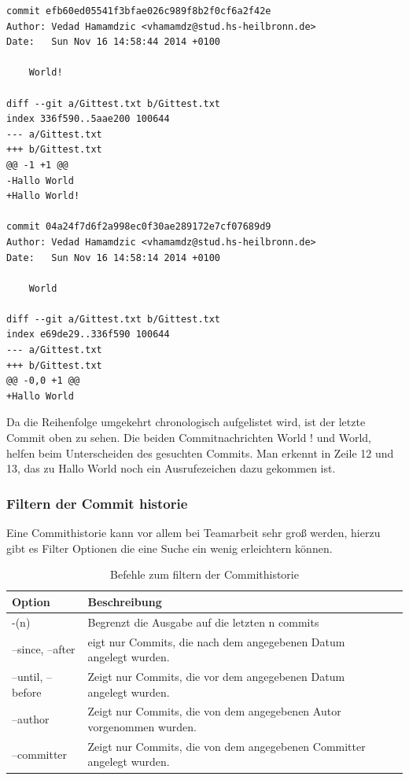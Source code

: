 \documentclass[12pt,a4paper,bibliography=totocnumbered,listof=totocnumbered]{scrartcl}
\begin{document}
\vspace{1em}
\begin{lstlisting}[caption=Git log Unterschiede der letzten 2 Commits, label=lst:arduino]
commit efb60ed05541f3bfae026c989f8b2f0cf6a2f42e
Author: Vedad Hamamdzic <vhamamdz@stud.hs-heilbronn.de>
Date:   Sun Nov 16 14:58:44 2014 +0100

    World!

diff --git a/Gittest.txt b/Gittest.txt
index 336f590..5aae200 100644
--- a/Gittest.txt
+++ b/Gittest.txt
@@ -1 +1 @@
-Hallo World
+Hallo World!

commit 04a24f7d6f2a998ec0f30ae289172e7cf07689d9
Author: Vedad Hamamdzic <vhamamdz@stud.hs-heilbronn.de>
Date:   Sun Nov 16 14:58:14 2014 +0100

    World

diff --git a/Gittest.txt b/Gittest.txt
index e69de29..336f590 100644
--- a/Gittest.txt
+++ b/Gittest.txt
@@ -0,0 +1 @@
+Hallo World
\end{lstlisting}
Da die Reihenfolge umgekehrt chronologisch aufgelistet wird, ist der letzte Commit oben zu sehen. Die beiden Commitnachrichten World ! und World, helfen beim Unterscheiden des gesuchten Commits. Man erkennt in Zeile 12 und 13, das zu Hallo World noch ein Ausrufezeichen dazu gekommen ist.
\newpage


\subsubsection{Filtern der Commit historie}
Eine Commithistorie kann vor allem bei Teamarbeit sehr groß werden, hierzu gibt es Filter Optionen die eine Suche ein wenig erleichtern können. 
 \vspace{1em}
\begin{table}[!h]
	\centering
	\begin{tabular}{|l|l|l|}
		\hline
		\textbf{Option} & \textbf{Beschreibung} \\
		\hline
		-(n)& Begrenzt die Ausgabe auf die letzten n commits\\
		\hline
		--since, --after & eigt nur Commits, die nach dem angegebenen Datum angelegt wurden.\\
		\hline
		--until, --before & Zeigt nur Commits, die vor dem angegebenen Datum angelegt wurden.\\
		\hline
		--author & Zeigt nur Commits, die von dem angegebenen Autor vorgenommen wurden.\\
		\hline
		--committer & Zeigt nur Commits, die von dem angegebenen Committer angelegt wurden.\\
		\hline
	\end{tabular}
	\caption{Befehle zum filtern der Commithistorie}
	\label{tab:Befehle}
\end{table}
\end{document}
